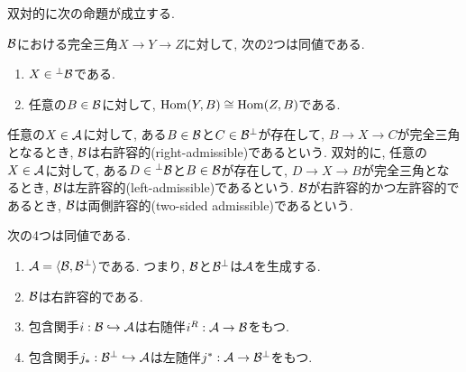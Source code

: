 \documentclass[uplatex, a4paper, 14Q, dvipdfmx]{jsarticle}
\begin{document}
双対的に次の命題が成立する.

\begin{corollary} \label{prop:in_perpB_equal_hom_equal_hom}
  $\mathcal{B}$における完全三角$X \to Y \to Z$に対して, 次の2つは同値である. 
  \begin{enumerate}
    \item $X \in {}^\perp \mathcal{B}$である.
    \item 任意の$B \in \mathcal{B}$に対して, $\mathrm{Hom}(Y,B) \cong \mathrm{Hom}(Z,B)$である. 
  \end{enumerate}
\end{corollary}

\begin{definition}[許容的]
  任意の$X \in \mathcal{A}$に対して, ある$B \in \mathcal{B}$と$C \in \mathcal{B}^\perp$が存在して, $B \to X \to C$が完全三角となるとき, $\mathcal{B}$は右許容的(right-admissible)であるという. 
  双対的に, 任意の$X \in \mathcal{A}$に対して, ある$D \in {}^\perp \mathcal{B}$と$B \in \mathcal{B}$が存在して, $D \to X \to B$が完全三角となるとき, $\mathcal{B}$は左許容的(left-admissible)であるという. 
  $\mathcal{B}$が右許容的かつ左許容的であるとき, $\mathcal{B}$は両側許容的(two-sided admissible)であるという. 
\end{definition}

\begin{theorem} \label{prop:generate_equal_right_adm}
  次の4つは同値である. 
  \begin{enumerate}
    \item $\mathcal{A} = \langle \mathcal{B},\mathcal{B}^\perp \rangle$である. つまり, $\mathcal{B}$と$\mathcal{B}^\perp$は$\mathcal{A}$を生成する. 
    \item $\mathcal{B}$は右許容的である.
    \item 包含関手$i : \mathcal{B} \hookrightarrow \mathcal{A}$は右随伴$i^R : \mathcal{A} \to \mathcal{B}$をもつ. 
    \item 包含関手$j_\ast : \mathcal{B}^\perp \hookrightarrow \mathcal{A}$は左随伴$j^\ast : \mathcal{A} \to \mathcal{B}^\perp$をもつ. 
  \end{enumerate}
\end{theorem}
\end{document}
